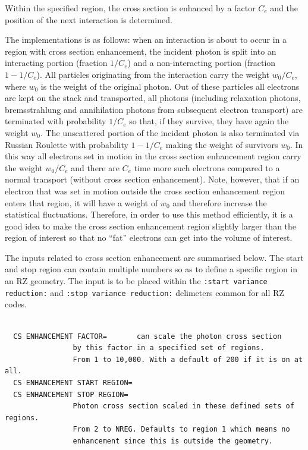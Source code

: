 \documentclass[12pt,twoside]{article}  %
\begin{document}
Within the specified region, the cross section is enhanced by a factor
$C_e$ and the position of the next interaction is determined.

The implementations is as follows: when an interaction is about
to occur in a region with cross section enhancement,
the incident photon is split into an interacting
portion (fraction $1/C_e$) and a non-interacting portion
(fraction $1-1/C_e$). All particles originating from the interaction
carry the weight $w_0/C_e$, where $w_0$ is the weight of the
original photon.
Out of these particles all electrons are kept on the stack
and transported, all photons (including relaxation photons,
bremsstrahlung and annihilation photons from subsequent
electron transport) are terminated with probability $1/C_e$ so that,
if they survive, they have again the weight $w_0$.
The unscattered portion of the incident photon is also terminated
via Russian Roulette with probability $1-1/C_e$ making
the weight of survivors $w_0$.
In this way all electrons set in motion in the
cross section enhancement region carry the weight $w_0/C_e$
and there are $C_e$ time more such electrons compared
to a normal transport (without cross section enhancement).
Note, however, that if an electron that was set in motion outside
the cross section enhancement region enters that region, it will
have a weight of $w_0$ and therefore increase the statistical
fluctuations. Therefore, in order to use this method efficiently,
it is a good idea to make the cross section enhancement region
slightly larger than the region of interest so that no
``fat'' electrons can get into the volume of interest.

The inputs related to cross section enhancement are summarised
below. The start and stop region can contain multiple numbers
so as to define a specific region in an RZ geometry. The
input is to be placed within the
{\tt :start variance reduction:} and
{\tt :stop variance reduction:} delimeters common for all
RZ codes.

\begin{verbatim}

  CS ENHANCEMENT FACTOR=       can scale the photon cross section
                by this factor in a specified set of regions.
                From 1 to 10,000. With a default of 200 if it is on at all.
  CS ENHANCEMENT START REGION=
  CS ENHANCEMENT STOP REGION=
                Photon cross section scaled in these defined sets of regions.
                From 2 to NREG. Defaults to region 1 which means no
                enhancement since this is outside the geometry.

\end{verbatim}
\end{document}
